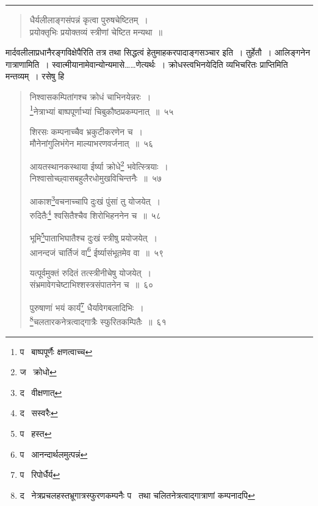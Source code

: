 \documentclass[11pt, openany]{book}
\begin{document}
\hrule

\begin{quote}
{\qt धैर्यलीलाङ्गसंपन्नं कृत्वा पुरुषचेष्टितम्~।\\
प्रयोक्तृभिः प्रयोक्तव्यं स्त्रीणां चेष्टित मन्यथा~॥}
\end{quote}

\noindent
मार्दवलीलाप्रधानैरङ्गविक्षेपैरिति तत्र तथा सिद्धत्वं हेतुमाहकरपादाङ्गसञ्चार इति~। तुर्हेतौ~। आलिङ्गनेन गात्राणामिति~। स्वात्मीयानामेवान्योन्यमासे\ldots \ldots णेत्यर्थः~। क्रोधस्त्वभिनयेदिति व्यभिचरितः प्राप्तिमिति मन्तव्यम्~। रसेषु हि

\newpage

\begin{quote}
{\na निश्वासकम्पितांगश्च क्रोधं चाभिनयेन्नरः~।\\
\renewcommand{\thefootnote}{1}\footnote{प \textendash\  बाष्पपूर्णैः क्षणत्वाच्च}नेत्राभ्यां बाष्पपूर्णाभ्यां चिबुकौष्ठप्रकम्पनात्~॥~५५

शिरसः कम्पनाच्चैव भ्रकुटीकरणेन च~।\\
मौनेनांगुलिभंगेन माल्याभरणवर्जनात्~॥~५६

आयतस्थानकस्थाया ईर्ष्या क्रोधे\renewcommand{\thefootnote}{2}\footnote{ज \textendash\  क्रोधो} भवेत्स्त्रियाः~।\\
निश्वासोच्छ्वासबहुलैरधोमुखविचिन्तनैः~॥~५७

आकाश\renewcommand{\thefootnote}{3}\footnote{द \textendash\  वीक्षणात्}वचनाच्चापि दुःखं पुंसां तु योजयेत्~।\\
रुदितैः\renewcommand{\thefootnote}{4}\footnote{द \textendash\  सस्वरैः} श्वसितैश्चैव शिरोभिहननेन च~॥~५८

भूमि\renewcommand{\thefootnote}{5}\footnote{प \textendash\  हस्त}पाताभिघातैश्च दुःखं स्त्रीषु प्रयोजयेत्~।\\
आनन्दजं चार्तिजं वा\renewcommand{\thefootnote}{6}\footnote{प \textendash\  आनन्दार्थलमुत्पन्नं} ईर्ष्यासंभूतमेव वा~॥~५९

यत्पूर्वमुक्तं रुदितं तत्स्त्रीनीचेषु योजयेत्~।\\
संभ्रमावेगचेष्टाभिश्शस्त्रसंपातनेन च~॥~६०

पुरुषाणां भयं कार्यं\renewcommand{\thefootnote}{7}\footnote{प \textendash\  रिपोर्धैर्य} धैर्यावेगबलादिभिः~।\\
\renewcommand{\thefootnote}{8}\footnote{द \textendash\  नेत्रप्रचलहस्तभ्रूगात्रस्फुरणकम्पनैः प \textendash\  तथा चलितनेत्रत्वाद्गात्राणां कम्पनादपि}चलतारकनेत्रत्वाद्गात्रैः स्फुरितकम्पितैः~॥~६१}
\end{quote}
\end{document}
